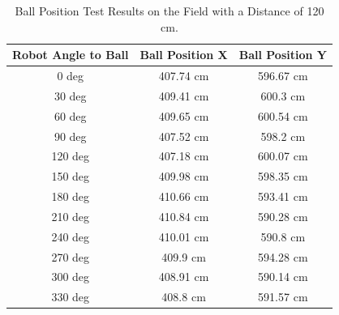 \begin{table}[htbp]
  \caption{Ball Position Test Results on the Field with a Distance of 120 cm.}
  \begin{center}
    \begin{tabular}{|c|c|c|}
      \hline
    \rowcolor[HTML]{C0C0C0}
  \textbf{Robot Angle to Ball} & \textbf{Ball Position X} & \textbf{Ball Position Y} \\
  \hline

  0 deg            & 407.74 cm                & 596.67 cm            \\
  30 deg           & 409.41 cm                & 600.3 cm            \\
  60 deg           & 409.65 cm                & 600.54 cm            \\
  90 deg           & 407.52 cm                & 598.2 cm           \\
  120 deg           & 407.18 cm                & 600.07 cm           \\
  150 deg           & 409.98 cm                & 598.35 cm           \\
  180 deg           & 410.66 cm                & 593.41 cm           \\
  210 deg           & 410.84 cm                & 590.28 cm           \\
  240 deg           & 410.01 cm                & 590.8 cm           \\
  270 deg           & 409.9 cm                & 594.28 cm           \\
  300 deg           & 408.91 cm                & 590.14 cm           \\
  330 deg           & 408.8 cm                & 591.57 cm           \\
  \hline
\end{tabular}
\end{center}
\end{table}

